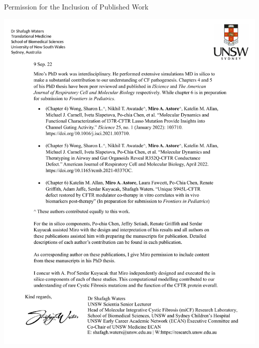 \newpage

\vspace{3in}

\begin{center}
\begin{Large}
\begin{bfseries}
Permission for the Inclusion of Published Work
\end{bfseries}
\end{Large}
\end{center}

\vspace{0.3in}


\begin{center}
	\includegraphics [width=\textwidth]{figures/shafa_letter_inclusion_of_published_work.pdf}
\end{center}

